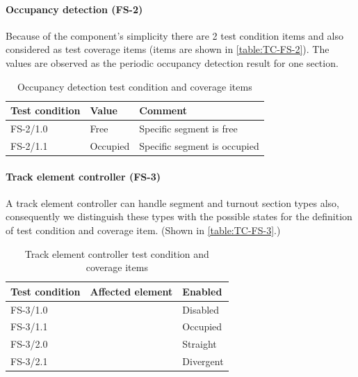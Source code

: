 \paragraph{Occupancy detection (FS-2)}
Because of the component's simplicity there are 2 test condition items and also considered as test coverage items (items are shown in \autoref{table:TC-FS-2}). The values are observed as the periodic occupancy detection result for one section.
\begin{table}[H]
	\caption{Occupancy detection test condition and coverage items}
	\label{table:TC-FS-2}
	\begin{center}
		\renewcommand{\arraystretch}{1.8}
		\begin{tabu} 
			to 0.9 \textwidth
			{  X[c] X[c] X[c] }
			\toprule
			Test condition & Value    & Comment             \\ \midrule
			FS-2/1.0       & Free     & Specific segment is free     \\
			FS-2/1.1       & Occupied & Specific segment is occupied \\ \bottomrule
		\end{tabu}
	\end{center}
\end{table}


\paragraph{Track element controller (FS-3)}
A track element controller can handle segment and turnout section types also, consequently we distinguish these types with the possible states for the definition of test condition and coverage item. (Shown in \autoref{table:TC-FS-3}.)
\begin{table}[H]
	\caption{Track element controller test condition and coverage items}
	\label{table:TC-FS-3}
	\begin{center}
		\renewcommand{\arraystretch}{1.8}
		\begin{tabu} 
			to 0.9 \textwidth
			{  X[c] X[c] X[c] }
			\toprule
			Test condition & Affected element               & Enabled     \\ \midrule
			FS-3/1.0       &  & Disabled   \\
			FS-3/1.1       &                                & Occupied  \\
			FS-3/2.0       &  & Straight  \\
			FS-3/2.1       &                                & Divergent \\ \bottomrule
		\end{tabu}
	\end{center}
\end{table} 

